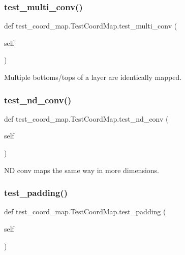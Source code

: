 \subsubsection{\texorpdfstring{test\+\_\+multi\+\_\+conv()}{test\_multi\_conv()}}
{\footnotesize\ttfamily def test\+\_\+coord\+\_\+map.\+Test\+Coord\+Map.\+test\+\_\+multi\+\_\+conv (\begin{DoxyParamCaption}\item[{}]{self }\end{DoxyParamCaption})}

\begin{DoxyVerb}Multiple bottoms/tops of a layer are identically mapped.
\end{DoxyVerb}
 \mbox{\label{classtest__coord__map_1_1_test_coord_map_a82d99d2dc04f75b4531b7e93afe3bdee}} 
\subsubsection{\texorpdfstring{test\+\_\+nd\+\_\+conv()}{test\_nd\_conv()}}
{\footnotesize\ttfamily def test\+\_\+coord\+\_\+map.\+Test\+Coord\+Map.\+test\+\_\+nd\+\_\+conv (\begin{DoxyParamCaption}\item[{}]{self }\end{DoxyParamCaption})}

\begin{DoxyVerb}ND conv maps the same way in more dimensions.
\end{DoxyVerb}
 \mbox{\label{classtest__coord__map_1_1_test_coord_map_a05e323174f0281214985c9fc25109bae}} 
\subsubsection{\texorpdfstring{test\+\_\+padding()}{test\_padding()}}
{\footnotesize\ttfamily def test\+\_\+coord\+\_\+map.\+Test\+Coord\+Map.\+test\+\_\+padding (\begin{DoxyParamCaption}\item[{}]{self }\end{DoxyParamCaption})}

